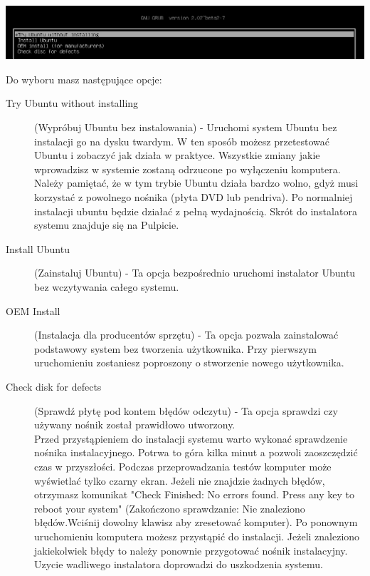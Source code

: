 \includegraphics[width=\linewidth]{images/instalacja_UEFI_boot.png}

Do wyboru masz następujące opcje:
\begin{description}
\item[Try Ubuntu without installing](Wypróbuj Ubuntu bez instalowania) - Uruchomi system Ubuntu bez instalacji go na dysku twardym. W ten sposób możesz przetestować Ubuntu i zobaczyć jak działa w praktyce. Wszystkie zmiany jakie wprowadzisz w systemie zostaną odrzucone po wyłączeniu komputera. Należy pamiętać, że w tym trybie Ubuntu działa bardzo wolno, gdyż musi korzystać z powolnego nośnika (płyta DVD lub pendriva). Po normalniej instalacji ubuntu będzie działać z pełną wydajnością. Skrót do instalatora systemu znajduje się na Pulpicie.
\item[Install Ubuntu](Zainstaluj Ubuntu) - Ta opcja bezpośrednio uruchomi instalator Ubuntu bez wczytywania całego systemu.
\item[OEM Install](Instalacja dla producentów sprzętu) - Ta opcja pozwala zainstalować podstawowy system bez tworzenia użytkownika. Przy pierwszym uruchomieniu zostaniesz poproszony o stworzenie nowego użytkownika.
\item[Check disk for defects](Sprawdź płytę pod kontem błędów odczytu) - Ta opcja sprawdzi czy używany nośnik został prawidłowo utworzony.\\
Przed przystąpieniem do instalacji systemu warto wykonać sprawdzenie nośnika instalacyjnego. Potrwa to góra kilka minut a pozwoli zaoszczędzić czas w przyszłości. Podczas przeprowadzania testów komputer może wyświetlać tylko czarny ekran. Jeżeli nie znajdzie żadnych błędów, otrzymasz komunikat "Check Finished: No errors found. Press any key to reboot your system" (Zakończono sprawdzanie: Nie znaleziono błędów.Wciśnij dowolny klawisz aby zresetować komputer). Po ponownym uruchomieniu komputera możesz przystąpić do instalacji. Jeżeli znaleziono jakiekolwiek błędy to należy ponownie przygotować nośnik instalacyjny. Uzycie wadliwego instalatora doprowadzi do uszkodzenia systemu. 
\end{description}

